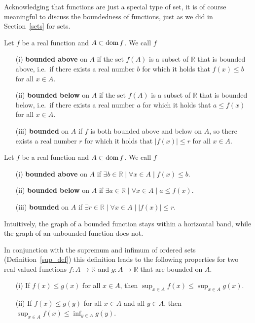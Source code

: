 \ifcourse
\ifanalysis

Acknowledging that functions are just a special type of set, it is of course meaningful to discuss the boundedness of functions, just as we did in Section~\ref{sets} for sets. 
\ifcalculus
\begin{definition}
Let $f$ be a real function and  $A\subset\text{dom}{\,} f$. We call $f$
\begin{enumerate}
\item[(i)]   \textbf{bounded above} on $A$ if the set $f(A)$ is a subset of $\mathbb{R}$ that is bounded above, i.e.\ if there exists a real number $b$ for which it holds that $f(x) \leq b$ for all  $x \in A$. 
\item[(ii)]    \textbf{bounded below} on $A$ if the set $f(A)$ is a subset of $\mathbb{R}$ that is bounded below, i.e.\ if there exists a real number $a$ for which it holds that $a \leq f(x)$ for all  $x \in A$. 
\item[(iii)] \textbf{bounded} on $A$ if $f$ is both bounded above and below on $A$, so there exists a real number $r$ for which it holds that $|f(x)| \leq r$ for all $x \in A$.
\end{enumerate} 
\end{definition} 
\fi
\ifanalysis
\begin{definition}
Let $f$ be a real function and  $A\subset\text{dom}{\,} f$. We call $f$
\begin{enumerate}
\item[(i)]    \textbf{bounded above} on $A$ if $\exists b\in\mathbb{R}\mid \forall x \in A\mid f(x) \leq b$. 
\item[(ii)]    \textbf{bounded below} on $A$ if
$\exists a\in\mathbb{R}\mid \forall x \in A\mid a \leq f(x)$. 
\item[(iii)]  \textbf{bounded} on $A$ if
$\exists r\in\mathbb{R}\mid \forall x \in A\mid |f(x)| \leq r$. 
\end{enumerate} 
\end{definition} 
\fi
Intuitively, the graph of a bounded function stays within a horizontal band, while the graph of an unbounded function does not.

In conjunction with the supremum and infimum of ordered sets (Definition~\ref{sup_def}) this definition leads to the following  properties for two real-valued functions $f: A \to \mathbb{R}$ and $g: A \to \mathbb{R}$ that are bounded on $A$. 
\begin{enumerate}
\item[(i)]  If $f(x) \leq g(x)$ for  all $x \in A$, then $\sup_{x \in A} f(x) \leq \sup_{x \in A} g(x)$.
\item[(ii)] If $f(x) \leq g(y)$ for all $x \in A$ and all $y \in A$, then $\sup_{x \in A} f(x) \leq \inf_{y \in A} g(y)$.
\end{enumerate}


